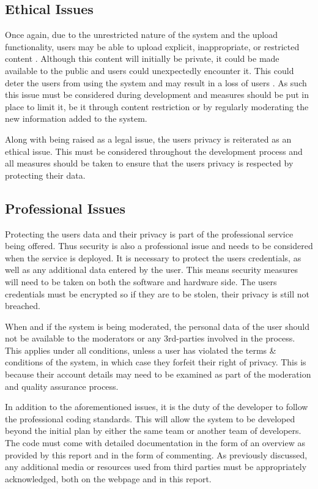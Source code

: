 \subsection{Ethical Issues} \label{Section:Ethical_Issues}
Once again, due to the unrestricted nature of the system and the upload functionality, users may be able to upload explicit, inappropriate, or restricted content \cite{SocialNetworkSites:RisksAndBenefits}. Although this content will initially be private, it could be made available to the public and users could unexpectedly encounter it. This could deter the users from using the system and may result in a loss of users \cite{SocialNetworkSites:RisksAndBenefits}. As such this issue must be considered during development and measures should be put in place to limit it, be it through content restriction or by regularly moderating the new information added to the system.

Along with being raised as a legal issue, the users privacy is reiterated as an ethical issue. This must be considered throughout the development process and all measures should be taken to ensure that the users privacy is respected by protecting their data.

\subsection{Professional Issues} \label{Section:Professional_Issues}
Protecting the users data and their privacy is part of the professional service being offered. Thus security is also a professional issue and needs to be considered when the service is deployed. It is necessary to protect the users credentials, as well as any additional data entered by the user. This means security measures will need to be taken on both the software and hardware side. The users credentials must be encrypted so if they are to be stolen, their privacy is still not breached. 

When and if the system is being moderated, the personal data of the user should not be available to the moderators or any 3rd-parties involved in the process. This applies under all conditions, unless a user has violated the terms \& conditions of the system, in which case they forfeit their right of privacy. This is because their account details may need to be examined as part of the moderation and quality assurance process.

In addition to the aforementioned issues, it is the duty of the developer to follow the professional coding standards. This will allow the system to be developed beyond the initial plan by either the same team or another team of developers. The code must come with detailed documentation in the form of an overview as provided by this report and in the form of commenting. As previously discussed, any additional media or resources used from third parties must be appropriately acknowledged, both on the webpage and in this report.

\newpage